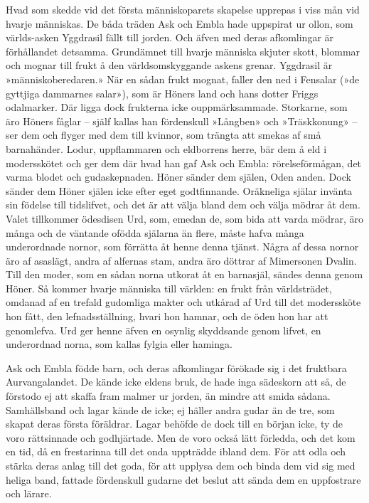 Hvad som skedde vid det första människoparets skapelse upprepas i viss
mån vid hvarje människas. De båda träden Ask och Embla hade uppspirat ur
ollon, som världs-asken Yggdrasil fällt till jorden. Och äfven med deras
afkomlingar är förhållandet detsamma. Grundämnet till hvarje människa
skjuter skott, blommar och mognar till frukt å den världsomskyggande
askens grenar. Yggdrasil är »människoberedaren.» När en sådan frukt
mognat, faller den ned i Fensalar (»de gyttjiga dammarnes salar»), som
är Höners land och hans dotter Friggs odalmarker. Där ligga dock
frukterna icke ouppmärksammade. Storkarne, som äro Höners fåglar --
själf kallas han fördenskull »Långben» och »Träskkonung» -- ser dem och
flyger med dem till kvinnor, som trängta att smekas af små barnahänder.
Lodur, uppflammaren och eldborrens herre, bär dem å eld i modersskötet
och ger dem där hvad han gaf Ask och Embla: rörelseförmågan, det varma
blodet och gudaskepnaden. Höner sänder dem själen, Oden anden. Dock
sänder dem Höner själen icke efter eget godtfinnande. Oräkneliga själar
invänta sin födelse till tidslifvet, och det är att välja bland dem och
välja mödrar åt dem. Valet tillkommer ödesdisen Urd, som, emedan de, som
bida att varda mödrar, äro många och de väntande ofödda själarna än
flere, måste hafva många underordnade nornor, som förrätta åt henne
denna tjänst. Några af dessa nornor äro af asaslägt, andra af alfernas
stam, andra äro döttrar af Mimersonen Dvalin. Till den moder, som en
sådan norna utkorat åt en barnasjäl, sändes denna genom Höner. Så kommer
hvarje människa till världen: en frukt från världsträdet, omdanad af en
trefald gudomliga makter och utkårad af Urd till det moderssköte hon
fått, den lefnadsställning,
\protect\hypertarget{lb1625905.xhtmlux5cux23start20}{}{}\protect\hypertarget{lb1625905.xhtmlux5cux23start20-a}{}{}\protect\hypertarget{lb1625905.xhtmlux5cux23start20-b}{}{}\protect\hypertarget{lb1625905.xhtmlux5cux23start20-c}{}{}\protect\hypertarget{lb1625905.xhtmlux5cux23start20-d}{}{}
hvari hon hamnar, och de öden hon har att genomlefva. Urd ger henne
äfven en osynlig skyddsande genom lifvet, en underordnad norna, som
kallas fylgia eller haminga.

Ask och Embla födde barn, och deras afkomlingar förökade sig i det
fruktbara Aurvangalandet. De kände icke eldens bruk, de hade inga
sädeskorn att så, de förstodo ej att skaffa fram malmer ur jorden, än
mindre att smida sådana. Samhällsband och lagar kände de icke; ej häller
andra gudar än de tre, som skapat deras första föräldrar. Lagar behöfde
de dock till en början icke, ty de voro rättsinnade och godhjärtade. Men
de voro också lätt förledda, och det kom en tid, då en frestarinna till
det onda uppträdde ibland dem. För att odla och stärka deras anlag till
det goda, för att upplysa dem och binda dem vid sig med heliga band,
fattade fördenskull gudarne det beslut att sända dem en uppfostrare och
lärare.

